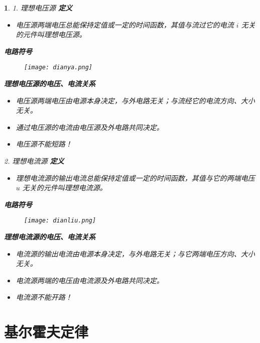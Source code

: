\documentclass[UTF8]{report}
\theoremstyle{MyLineTheoremStyle} %
\theoremstyle{MyBlockTheoremStyle} %
\theoremstyle{MySubsubsectionStyle} %
\newtheorem{definition}{}
\begin{document}
\begin{definition}
    1. 理想电压源
    \textbf{定义}
    \begin{itemize}
        \item 电压源两端电压总能保持定值或一定的时间函数，其值与流过它的电流 $i$ 无关的元件叫理想电压源。
    \end{itemize}
    \textbf{电路符号}
    \begin{figure}[ht]
        \centering
        \texttt{[image: dianya.png]}
    \end{figure}
    \textbf{理想电压源的电压、电流关系}
    \begin{itemize}
        \item 电压源两端电压由电源本身决定，与外电路无关；与流经它的电流方向、大小无关。
        \item 通过电压源的电流由电压源及外电路共同决定。
        \item 电压源不能短路！
    \end{itemize}

    2. 理想电流源
    \textbf{定义}
    \begin{itemize}
        \item 理想电流源的输出电流总能保持定值或一定的时间函数，其值与它的两端电压 $u$ 无关的元件叫理想电流源。
    \end{itemize}
    \textbf{电路符号}
    \begin{figure}[ht]
        \centering
        \texttt{[image: dianliu.png]}
    \end{figure}
    \textbf{理想电流源的电压、电流关系}
    \begin{itemize}
        \item 电流源的输出电流由电源本身决定，与外电路无关；与它两端电压方向、大小无关。
        \item 电流源两端的电压由电流源及外电路共同决定。
        \item 电流源不能开路！
    \end{itemize}
\end{definition}

\section{基尔霍夫定律}
\end{document}
